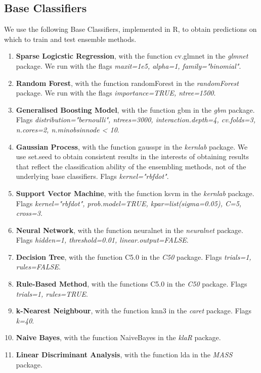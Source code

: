 \documentclass{bioinfo}
\begin{document}
\begin{methods}
\subsection{Base Classifiers}

We use the following Base Classifiers, implemented in R, to obtain predictions on which to train and test ensemble methods.

\begin{enumerate}

    \item \textbf{Sparse Logicstic Regression}, with the function cv.glmnet in the \textit{glmnet} package. We run with the flags \textit{maxit=1e5, alpha=1, family="binomial"}.
    \item \textbf{Random Forest}, with the function randomForest in the \textit{randomForest} package. We run with the flags \textit{importance=TRUE, ntree=1500}.
    \item \textbf{Generalised Boosting Model}, with the function gbm in the \textit{gbm} package. Flags \textit{distribution="bernoulli", ntrees=3000, interaction.depth=4, cv.folds=3, n.cores=2, n.minobsinnode < 10}.
    \item \textbf{Gaussian Process}, with the function gausspr in the \textit{kernlab} package. We use set.seed to obtain consistent results in the interests of obtaining results that reflect the classification ability of the ensembling methods, not of the underlying base classifiers. Flags \textit{kernel="rbfdot"}.
    \item \textbf{Support Vector Machine}, with the function ksvm in the \textit{kernlab} package. Flags \textit{kernel="rbfdot", prob.model=TRUE, kpar=list(sigma=0.05), C=5, cross=3}.
    \item \textbf{Neural Network}, with the function neuralnet in the \textit{neuralnet} package. Flags \textit{hidden=1, threshold=0.01, linear.output=FALSE}.
    \item \textbf{Decision Tree}, with the function C5.0 in the \textit{C50} package. Flags \textit{trials=1, rules=FALSE}.
    \item \textbf{Rule-Based Method}, with the functions C5.0 in the \textit{C50} package. Flags \textit{trials=1, rules=TRUE}.
    \item \textbf{k-Nearest Neighbour}, with the function knn3 in the \textit{caret} package. Flags \textit{k=40}.
    \item \textbf{Naive Bayes}, with the function NaiveBayes in the \textit{klaR} package.
    \item \textbf{Linear Discriminant Analysis}, with the function lda in the  \textit{MASS} package. 
\end{enumerate}



\end{methods}
\end{document}
